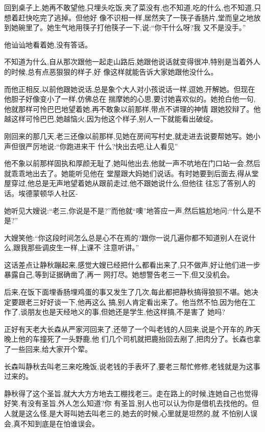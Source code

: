 ﻿\documentclass[12pt]{article}
\begin{document}
回到桌子上,她再不敢望他,只埋头吃饭,夹了菜没有,也不知道,吃的什么,也不知道,只想着赶快吃完了逃掉。但他好
像不识相一样,居然夹了一筷子香肠片,堂而皇之地放到她碗里了。她生气地用筷子打他筷子一下,说:``你干什么呀?我
又不是没手。''

他讪讪地看着她,没有答话。

不知道为什么,自从那次跟他一起走山路后,她跟他说话就变得很冲,特别是当着外人的时候,总有点恶狠狠的样子,好
像这样就能告诉大家她跟他没什么。

而他正相反,以前他跟她说话,总是象个大人对小孩说话一样,逗她,开解她。但现在他胆子好像变小了一样,仿佛总在
揣摩她的心思,要讨她喜欢似的。她抢白他一句,他就那样可怜巴巴地望着她,再不敢象以前那样,带点不讲理的神情
跟她狡辩了。他越这样可怜巴巴,她越恼火,因为他这个样子,别人一下就能看出破绽。

刚回来的那几天,老三还像以前那样,见她在房间写村史,就走进去说要帮她写。她小声但很严厉地说:``你跑进来干
什么?快出去吧,让人看见\myrule ''

他不象以前那样固执和厚颜无耻了,她叫他出去,他就一声不吭地在门口站一会,然后就乖乖地出去了。她能听见他在
堂屋跟大妈她们说话。有时她要到后面去,得从堂屋穿过,他总是无声地望着她从跟前走过,他不跟她说什么,但他往
往忘了答别人的话。埃德蒙顿华人社区-

她听见大嫂说:``老三,你说是不是?''而他就``噢''地答应一声,然后尴尬地问:``什么是不是?''

大嫂笑他:``你这段时间怎么总是心不在焉的?跟你一说几遍你都不知道别人在说什么,跟我那些调皮生一样,上课不
注意听讲。''

这话差点让静秋蹦起来,感觉大嫂已经把什么都看出来了,只不做声,好让他们进一步暴露自己,等到证据确凿了,再一
网打尽。她想警告老三一下,但又没机会。

后来,在饭下面埋香肠埋鸡蛋的事又发生了几次,每此都把静秋搞得狼狈不堪。她决定要跟老三好好谈一下,他再这么
搞,别人肯定看出来了。他当然不怕,因为他在工作了,谈朋友也是天经地义的事,但她还是学生,他这样搞,不是害了
她吗?

正好有天老大长森从严家河回来了,还带了一个叫老钱的人回来,说是个开车的,昨天晚上他的车撞死了一头野鹿,他
们几个司机就把鹿抬回去剐了,把肉分了。长森也拿了一些回来,给大家开个荤。

长森叫静秋去叫老三来吃晚饭,说老钱的手表坏了,要老三帮忙修修,老钱就是为这事过来的。

静秋得了这个圣旨,就大大方方地去工棚找老三。走在路上的时候,连她自己也觉得好笑,有没有圣旨,外人怎么知道?你
有圣旨,别人也可以认为你是借机去找他的。但人就是这么怪,是大哥叫她去叫老三的,她去的时候,心里就是坦然的,就
不怕别人误会,真不知到底是在怕谁误会。
\end{document}
